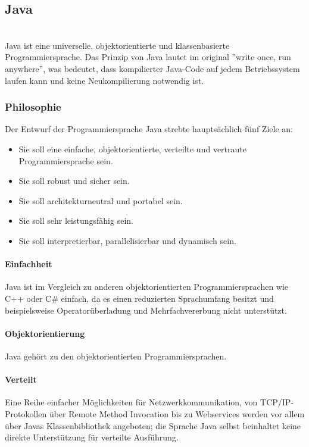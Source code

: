 \subsection{Java}\ \\
Java ist eine universelle, objektorientierte und klassenbasierte Programmiersprache. Das Prinzip von Java lautet im original ''write once, run anywhere'', was bedeutet, dass kompilierter Java-Code auf jedem Betriebssystem laufen kann und keine Neukompilierung notwendig ist.
\subsubsection{Philosophie}
Der Entwurf der Programmiersprache Java strebte hauptsächlich fünf Ziele an:

\begin{itemize}
	\item Sie soll eine einfache, objektorientierte, verteilte und vertraute Programmiersprache sein.
	\item Sie soll robust und sicher sein.
	\item Sie soll architekturneutral und portabel sein.
	\item Sie soll sehr leistungsfähig sein.
	\item Sie soll interpretierbar, parallelisierbar und dynamisch sein.
\end{itemize}
\noindent

\paragraph{Einfachheit}
Java ist im Vergleich zu anderen objektorientierten Programmiersprachen wie C++ oder C\# einfach, da es einen reduzierten Sprachumfang besitzt und beispielsweise Operatorüberladung und Mehrfachvererbung nicht unterstützt.

\paragraph{Objektorientierung}
Java gehört zu den objektorientierten Programmiersprachen.

\paragraph{Verteilt}
Eine Reihe einfacher Möglichkeiten für Netzwerkkommunikation, von TCP/IP-Protokollen über Remote Method Invocation bis zu Webservices werden vor allem über Javas Klassenbibliothek angeboten; die Sprache Java selbst beinhaltet keine direkte Unterstützung für verteilte Ausführung.

